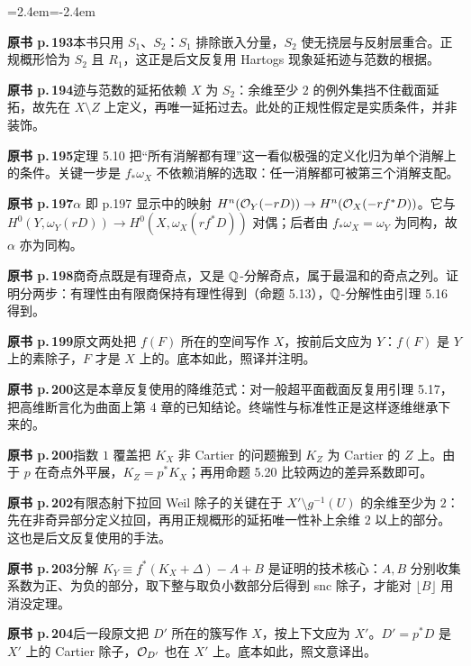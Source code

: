 \begin{list}{}{\leftmargin=2.4em\itemindent=-2.4em\itemsep=2pt\parsep=0pt}
\item \textbf{原书 p.\,193}\quad 本书只用 $S_1$、$S_2$：$S_1$ 排除嵌入分量，$S_2$ 使无挠层与反射层重合。正规概形恰为 $S_2$ 且 $R_1$，这正是后文反复用 Hartogs 现象延拓迹与范数的根据。
\item \textbf{原书 p.\,194}\quad 迹与范数的延拓依赖 $X$ 为 $S_2$：余维至少 $2$ 的例外集挡不住截面延拓，故先在 $X\setminus Z$ 上定义，再唯一延拓过去。此处的正规性假定是实质条件，并非装饰。
\item \textbf{原书 p.\,195}\quad 定理 5.10 把“所有消解都有理”这一看似极强的定义化归为单个消解上的条件。关键一步是 $f_*\omega_X$ 不依赖消解的选取：任一消解都可被第三个消解支配。
\item \textbf{原书 p.\,197}\quad $\alpha$ 即 p.197 显示中的映射 $H^n(\mathcal{O}_Y(-rD))\to H^n(\mathcal{O}_X(-rf^*D))$。它与 $H^0(Y,\omega_Y(rD))\to H^0(X,\omega_X(rf^*D))$ 对偶；后者由 $f_*\omega_X=\omega_Y$ 为同构，故 $\alpha$ 亦为同构。
\item \textbf{原书 p.\,198}\quad 商奇点既是有理奇点，又是 $\mathbb{Q}$-分解奇点，属于最温和的奇点之列。证明分两步：有理性由有限商保持有理性得到（命题 5.13），$\mathbb{Q}$-分解性由引理 5.16 得到。
\item \textbf{原书 p.\,199}\quad 原文两处把 $f(F)$ 所在的空间写作 $X$，按前后文应为 $Y$：$f(F)$ 是 $Y$ 上的素除子，$F$ 才是 $X$ 上的。底本如此，照译并注明。
\item \textbf{原书 p.\,200}\quad 这是本章反复使用的降维范式：对一般超平面截面反复用引理 5.17，把高维断言化为曲面上第 4 章的已知结论。终端性与标准性正是这样逐维继承下来的。
\item \textbf{原书 p.\,200}\quad 指数 $1$ 覆盖把 $K_X$ 非 Cartier 的问题搬到 $K_Z$ 为 Cartier 的 $Z$ 上。由于 $p$ 在奇点外平展，$K_Z=p^*K_X$；再用命题 5.20 比较两边的差异系数即可。
\item \textbf{原书 p.\,202}\quad 有限态射下拉回 Weil 除子的关键在于 $X'\setminus g^{-1}(U)$ 的余维至少为 $2$：先在非奇异部分定义拉回，再用正规概形的延拓唯一性补上余维 $2$ 以上的部分。这也是后文反复使用的手法。
\item \textbf{原书 p.\,203}\quad 分解 $K_Y\equiv f^*(K_X+\Delta)-A+B$ 是证明的技术核心：$A,B$ 分别收集系数为正、为负的部分，取下整与取负小数部分后得到 snc 除子，才能对 $\lfloor B\rfloor$ 用消没定理。
\item \textbf{原书 p.\,204}\quad 后一段原文把 $D'$ 所在的簇写作 $X$，按上下文应为 $X'$。$D'=p^*D$ 是 $X'$ 上的 Cartier 除子，$\mathcal{O}_{D'}$ 也在 $X'$ 上。底本如此，照文意译出。

\end{list}
